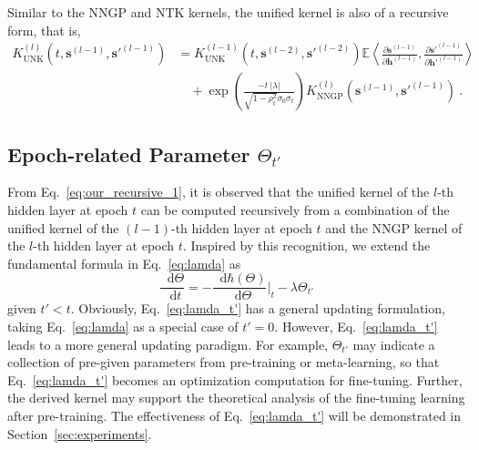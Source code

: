 \documentclass[review,10pt]{JMtemplate}
\newcommand*{\dif}{\mathop{}\!\mathrm{d}}
\begin{document}
Similar to the NNGP and NTK kernels, the unified kernel is also of a recursive form, that is,
\begin{equation}  \label{eq:our_recursive_1}
\begin{aligned}
K_{\textrm{UNK}}^{(l)} \left( t, \boldsymbol{s}^{(l-1)}, \boldsymbol{s}'^{(l-1)} \right)
&= K_{\textrm{UNK}}^{(l-1)} \left( t,  \boldsymbol{s}^{(l-2)}, \boldsymbol{s}'^{(l-2)} \right) \mathbb{E} \left\langle \frac{\partial \boldsymbol{s}^{(l-1)}}{\partial \boldsymbol{h}^{(l-1)}} ,  \frac{\partial \boldsymbol{s}'^{(l-1)}}{\partial \boldsymbol{h}'^{(l-1)}} \right\rangle \\
&\quad+ \exp\left( \frac{ -t ~|\lambda|}{\sqrt{1-\rho_{t}^2}\sigma_0\sigma_t} \right) K_{\textrm{NNGP}}^{(l)} \left( \boldsymbol{s}^{(l-1)}, \boldsymbol{s}'^{(l-1)}\right) \ .
\end{aligned}
\end{equation}



\subsection{Epoch-related Parameter $\Theta_{t'}$} \label{subsec:epoch}
From Eq.~\eqref{eq:our_recursive_1}, it is observed that the unified kernel of the $l$-th hidden layer at epoch $t$ can be computed recursively from a combination of the unified kernel of the $(l-1)$-th hidden layer at epoch $t$ and the NNGP kernel of the $l$-th hidden layer at epoch $t$. Inspired by this recognition, we extend the fundamental formula in Eq.~\eqref{eq:lamda} as 
\begin{equation}  \label{eq:lamda_t'}
\frac{\dif \Theta}{\dif t} =  -  \frac{\dif \hbar(\Theta)}{\dif \Theta} \Big|_t - \lambda \Theta_{t'} 
\end{equation}
given $t' < t$. Obviously, Eq.~\eqref{eq:lamda_t'} has a general updating formulation, taking Eq.~\eqref{eq:lamda} as a special case of $t'=0$. However, Eq.~\eqref{eq:lamda_t'} leads to a more general updating paradigm. For example, $\Theta_{t'}$ may indicate a collection of pre-given parameters from pre-training or meta-learning, so that Eq.~\eqref{eq:lamda_t'} becomes an optimization computation for fine-tuning. Further, the derived kernel may support the theoretical analysis of the fine-tuning learning after pre-training. The effectiveness of Eq.~\eqref{eq:lamda_t'} will be demonstrated in Section~\ref{sec:experiments}.
\end{document}
